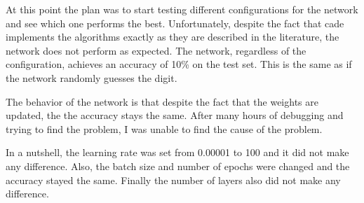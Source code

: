 
At this point the plan was to start testing different configurations for the network
and see which one performs the best. Unfortunately, despite the fact that cade implements
the algorithms exactly as they are described in the literature, the network does not perform
as expected. The network, regardless of the configuration, achieves an accuracy of 10\% on
the test set. This is the same as if the network randomly guesses the digit.

The behavior of the network is that despite the fact that the weights are updated, the
the accuracy stays the same. After many hours of debugging and trying to find the problem,
I was unable to find the cause of the problem.

In a nutshell, the learning rate was set from 0.00001 to 100 and it did not make any
difference. Also, the batch size and number of epochs were changed and the accuracy stayed
the same. Finally the number of layers also did not make any difference.